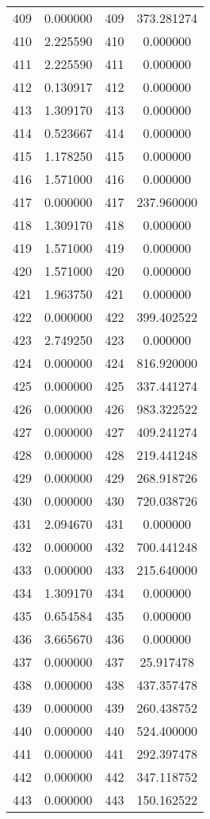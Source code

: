 \documentclass[12pt]{article}
\begin{document}
\begin{longtable}{@{}cccc@{}}
409 & 0.000000 & 409 & 373.281274 \\
410 & 2.225590 & 410 & 0.000000 \\
411 & 2.225590 & 411 & 0.000000 \\
412 & 0.130917 & 412 & 0.000000 \\
413 & 1.309170 & 413 & 0.000000 \\
414 & 0.523667 & 414 & 0.000000 \\
415 & 1.178250 & 415 & 0.000000 \\
416 & 1.571000 & 416 & 0.000000 \\
417 & 0.000000 & 417 & 237.960000 \\
418 & 1.309170 & 418 & 0.000000 \\
419 & 1.571000 & 419 & 0.000000 \\
420 & 1.571000 & 420 & 0.000000 \\
421 & 1.963750 & 421 & 0.000000 \\
422 & 0.000000 & 422 & 399.402522 \\
423 & 2.749250 & 423 & 0.000000 \\
424 & 0.000000 & 424 & 816.920000 \\
425 & 0.000000 & 425 & 337.441274 \\
426 & 0.000000 & 426 & 983.322522 \\
427 & 0.000000 & 427 & 409.241274 \\
428 & 0.000000 & 428 & 219.441248 \\
429 & 0.000000 & 429 & 268.918726 \\
430 & 0.000000 & 430 & 720.038726 \\
431 & 2.094670 & 431 & 0.000000 \\
432 & 0.000000 & 432 & 700.441248 \\
433 & 0.000000 & 433 & 215.640000 \\
434 & 1.309170 & 434 & 0.000000 \\
435 & 0.654584 & 435 & 0.000000 \\
436 & 3.665670 & 436 & 0.000000 \\
437 & 0.000000 & 437 & 25.917478 \\
438 & 0.000000 & 438 & 437.357478 \\
439 & 0.000000 & 439 & 260.438752 \\
440 & 0.000000 & 440 & 524.400000 \\
441 & 0.000000 & 441 & 292.397478 \\
442 & 0.000000 & 442 & 347.118752 \\
443 & 0.000000 & 443 & 150.162522 \\

\end{longtable}
\end{document}
